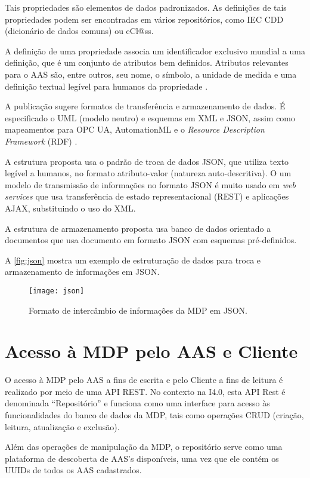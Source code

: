 	Tais propriedades são elementos de dados padronizados. As definições de tais propriedades podem ser encontradas em vários repositórios, como IEC CDD (dicionário de dados comuns) ou eCl@ss.
	
	A definição de uma propriedade associa um identificador exclusivo mundial a uma definição, que é um conjunto de atributos bem definidos. Atributos relevantes para o AAS são, entre outros, seu nome, o símbolo, a unidade de medida e uma definição textual legível para humanos da propriedade \cite{bader2019aas}.
	
	A publicação sugere formatos de transferência e armazenamento de dados. É especificado o UML (modelo neutro) e esquemas em XML e JSON, assim como mapeamentos para OPC UA, AutomationML e o \textit{Resource Description Framework} (RDF) \cite{plattform2019detailsaas}.
	
	A estrutura proposta usa o padrão de troca de dados JSON, que utiliza texto legível a humanos, no formato atributo-valor (natureza auto-descritiva). O um modelo de transmissão de informações no formato JSON é muito usado em \textit{web services} que usa transferência de estado representacional (REST) e aplicações AJAX, substituindo o uso do XML.
	
	A estrutura de armazenamento proposta usa banco de dados orientado a documentos que usa documento em formato JSON com esquemas pré-definidos.
	
	A \autoref{fig:json} mostra um exemplo de estruturação de dados para troca e armazenamento de informações em JSON.
	
	\begin{figure}[htb]
		\centering
		\caption{Formato de intercâmbio de informações da MDP em JSON.}
		\label{fig:json}
		\texttt{[image: json]}
  \end{figure}
  

\section{Acesso à MDP pelo AAS e Cliente}
	\label{comunicacao-CS}
	
	O acesso à MDP pelo AAS a fins de escrita e pelo Cliente a fins de leitura é realizado por meio de uma API REST. No contexto na I4.0, esta API Rest é denominada ``Repositório'' e funciona como uma interface para acesso às funcionalidades do banco de dados da MDP, tais como operações CRUD (criação, leitura, atualização e exclusão).
	
	Além das operações de manipulação da MDP, o repositório serve como uma plataforma de descoberta de AAS's disponíveis, uma vez que ele contém os UUIDs de todos os AAS cadastrados.
	
